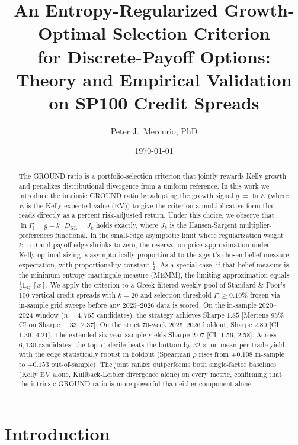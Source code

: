 \documentclass[11pt]{article}
\title{An Entropy-Regularized Growth-Optimal Selection Criterion \\
       for Discrete-Payoff Options: \\
       Theory and Empirical Validation on SP100 Credit Spreads}
\author{Peter J.~Mercurio, PhD}
\affil{\small \texttt{peter.mercurio@alumni.utoronto.ca}}
\date{\today}
\theoremstyle{definition}
\theoremstyle{remark}
\newcommand{\E}{\mathbb{E}}
\newcommand{\Q}{\mathbb{Q}}
\newcommand{\KL}{D_{\mathrm{KL}}}
\newcommand{\GROUND}{\Gamma_{\mathrm{i}}}
\begin{document}
\maketitle

\begin{abstract}
The GROUND ratio is a portfolio-selection criterion that jointly
rewards Kelly growth and penalizes distributional divergence from a
uniform reference. In this work we introduce the intrinsic GROUND ratio by adopting the growth signal $g := \ln E$
(where $E$ is the Kelly expected value (EV)) to give the criterion a multiplicative
form that reads directly as a percent risk-adjusted return. Under this
choice, we observe that $\ln \GROUND = g - k \cdot \KL = J_k$ holds
exactly, where $J_k$ is the Hansen-Sargent multiplier-preferences functional. In the small-edge asymptotic limit where regularization weight $k \to 0$ and payoff edge shrinks to zero,
the reservation-price approximation under Kelly-optimal sizing is asymptotically proportional to
the agent's chosen belief-measure expectation, with proportionality constant $\tfrac{1}{2}$. As a special case, if that belief measure is
the minimum-entropy martingale measure (MEMM), the limiting approximation equals $\tfrac{1}{2}\E_{\Q^\star}[x]$. We apply the criterion to a
Greek-filtered weekly pool of Standard \& Poor's 100 vertical credit
spreads with $k = 20$ and selection threshold $\GROUND \geq 0.10\%$
frozen via in-sample grid sweeps before any 2025--2026 data is
scored. On the in-sample 2020--2024 window ($n=4{,}765$ candidates),
the strategy achieves Sharpe $1.85$ [Mertens 95\% CI on Sharpe: 1.33, 2.37].
On the strict 70-week 2025--2026 holdout, Sharpe $2.80$ [CI: 1.39, 4.21]. The extended
six-year sample yields Sharpe $2.07$ [CI: 1.56, 2.58]. Across
$6{,}130$ candidates, the top $\GROUND$ decile beats the bottom by
$32\times$ on mean per-trade yield, with the edge statistically
robust in holdout (Spearman $\rho$ rises from $+0.108$ in-sample to
$+0.153$ out-of-sample). The joint ranker outperforms both single-factor baselines (Kelly EV alone,
Kullback-Leibler divergence alone) on every metric, confirming that the intrinsic GROUND ratio is more powerful than either component alone.
\end{abstract}


\section{Introduction}\label{sec:intro}
\end{document}
